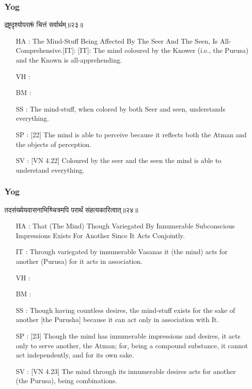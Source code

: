 \begin{frame}[fragile]\frametitle{Yog}
\begin{sanskrit}
द्रष्टृदृश्योपरक्तं चित्तं सर्वार्थम्॥२३॥
\end{sanskrit}

	\begin{itemize}
	\item [HA]: The Mind-Stuff Being Affected By The Seer And The Seen, Is All-Comprehensive.[IT]: [IT]: The mind coloured by the Knower (i.e., the Purusa) and the Known is all-apprehending.
	\item [VH]: 
	\item [BM]: 
	\item [SS]: The mind-stuff, when colored by both Seer and seen, understands everything.
	\item [SP]: [22] The mind is able to perceive because it reflects both the Atman and the objects of perception.
	\item [SV]: [VN 4.22] Coloured by the seer and the seen the mind is able to understand everything.
	\end{itemize}
\end{frame}


\begin{frame}[fragile]\frametitle{Yog}
\begin{sanskrit}
तदसंख्येयवासनाभिश्र्चित्रमपि परार्थं संहत्यकारित्वात्॥२४॥
\end{sanskrit}

	\begin{itemize}
	\item [HA]: That (The Mind) Though Variegated By Innumerable Subconscious Impressions Exists For Another Since It Acts Conjointly.
	\item [IT]: Through variegated by innumerable Vasanas it (the mind) acts for another (Purusa) for it acts in association.
	\item [VH]: 
	\item [BM]: 
	\item [SS]: Though having countless desires, the mind-stuff exists for the sake of another [the Purusha] because it can act only in association with It.
	\item [SP]: [23] Though the mind has innumerable impressions and desires, it acts only to serve another, the Atman; for, being a compound substance, it cannot act independently, and for its own sake.
	\item [SV]: [VN 4.23] The mind through its innumerable desires acts for another (the Purusa), being combinations. 
	\end{itemize}
\end{frame}


